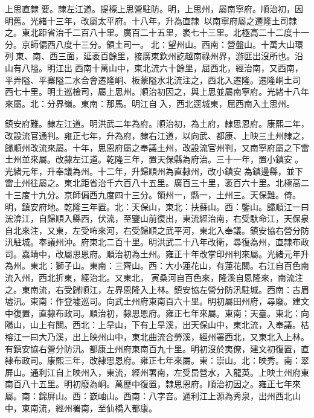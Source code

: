 \begin{pinyinscope}
上思直隸要。隸左江道。提標上思營駐防。明，上思州，屬南寧府。順治初，因明舊。光緒十三年，改屬太平府。十八年，升為直隸，以南寧府屬之遷隆土司隸之。東北距省治千二百八十里。廣百二十五里，袤七十三里。北極高二十二度十一分。京師偏西八度十三分。領土司一。北：望州山。西南：營盤山。十萬大山環列東、南、西三面，延袤百餘里，接廣東欽州訖越南祿州界，游匪出沒所也。沿山有八隘。明江出西南十萬山中，東北流六十餘里，屈西北，經治南，又西南，平弄隘、平寨隘二水合會遷隆峒、板蒙隘水北流注之，西北入遷隆。遷隆峒土司西七十里。明土巡檢司，屬上思州。順治初因之，與上思並屬南寧府。光緒十八年來屬。北：分界嶺。東南：那馬。明江自入，西北逕城東，屈西南入土思州。

鎮安府難。隸左江道。明洪武二年為府。順治初，為土府，隸思恩府。康熙二年，改設流官通判。雍正七年，升為府，隸右江道，以向武、都康、上映三土州隸之，歸順州改流來屬。十年，思恩府屬之奉議土州，改設流官州判，又南寧府屬之下雷土州並來屬。改隸左江道。乾隆三年，置天保縣為府治。三十一年，置小鎮安。光緒元年，升奉議為州。十二年，升歸順州為直隸州，改小鎮安為鎮邊縣，並下雷土州往屬之。東北距省治千六百八十五里。廣百三十里，袤百六十里。北極高二十三度十九分。京師偏西九度四十三分。領州一，縣一，土州三。天保難。倚。明，鎮安府地。乾隆三年置。北：天保山，東北：扶蘇山。西：鑒山。歸順江一曰浤渰江，自歸順入縣西，伏流，至鑒山前復出，東流經治南，右受馱命江，天保泉自北來注，又東，左受咘來河，右受歸順之武平河，東北入奉議。鎮安協右營分防汛駐城。奉議州沖。府東北二百十里。明洪武二十八年改衛，尋復為州，直隸布政司。嘉靖中，改屬思恩府。順治初為土州。雍正十年改掌印州判來屬。光緒元年升為州。東北：獅子山。東南：三齊山。西：大小蓮花山，有蓮花關。右江自百色南流入州，西北折東，經治北。又東北，寅桑河自百色來，隆溪自恩隆來，南流注之。東南流，右受歸順江，左界恩隆入上林。鎮安協左營分防汛駐城。西南：古眉墟汛。東南：作登墟巡司。向武土州府東南百六十里。明初屬田州府，尋廢。建文中復置，直隸布政司。順治初，隸思恩府。雍正七年來屬。東南：天臺。東北：向陽山，山上有關。西北：上旱山，下有上旱溪，出天保山中，東北流，入奉議。枯榕江一曰大乃溪，出上映州山中，東北曲流合勞溪，經州署西北，又東北入上林。有鎮安協右營分防汛。都康土州府東南百九十里。明初沒於夷僚，建文初復置，直隸布政司。康熙三年，改隸思恩府。雍正七年來屬。東：崇山。北：映秀。南：翠屏山。通利江自上映州入，東流，經州署南，左受岊營水，入龍英。上映土州府東南百八十五里。明初廢為峒。萬歷中復置，隸思恩府。順治初因之。雍正七年來屬。南：錦屏山。西：嶔岫山。西南：八字咅。通利江上源為秀泉，出州西北山中，東南流，經州署南，至仙橋入都康。


\end{pinyinscope}
